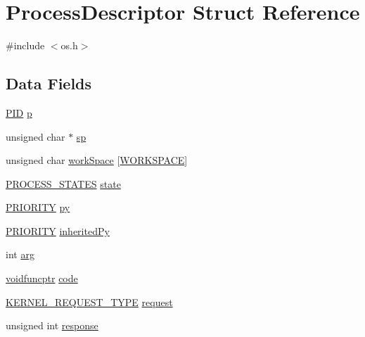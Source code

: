 \hypertarget{struct_process_descriptor}{}\section{Process\+Descriptor Struct Reference}
\label{struct_process_descriptor}


{\ttfamily \#include $<$os.\+h$>$}

\subsection*{Data Fields}
\begin{DoxyCompactItemize}
\item 
\hyperlink{os_8h_aa4f4d03691545cda70a42801c8b9096b}{P\+ID} \hyperlink{struct_process_descriptor_a29d3134ed439391d0cda6a328e877bb1}{p}
\item 
unsigned char $\ast$ \hyperlink{struct_process_descriptor_a66da4a0e35ef7a8e713697892196dddd}{sp}
\item 
unsigned char \hyperlink{struct_process_descriptor_ad45e5fb3f0fb598c044bcca7df695216}{work\+Space} \mbox{[}\hyperlink{os_8h_a420f71a6e3a201757631a92a1fb38529}{W\+O\+R\+K\+S\+P\+A\+CE}\mbox{]}
\item 
\hyperlink{os_8h_a0112d02f802d8a370eaed35faebd4502}{P\+R\+O\+C\+E\+S\+S\+\_\+\+S\+T\+A\+T\+ES} \hyperlink{struct_process_descriptor_af52ec0132414b93b48b8dae2e7b747b6}{state}
\item 
\hyperlink{os_8h_ac7feb3cd411cb0c0924b0defb19127d4}{P\+R\+I\+O\+R\+I\+TY} \hyperlink{struct_process_descriptor_af659a520409211372b37d3d07e89d039}{py}
\item 
\hyperlink{os_8h_ac7feb3cd411cb0c0924b0defb19127d4}{P\+R\+I\+O\+R\+I\+TY} \hyperlink{struct_process_descriptor_a68c51a8b8e163186c18347d7075be223}{inherited\+Py}
\item 
int \hyperlink{struct_process_descriptor_af09bff4320de23f28f0d261c3b124d6b}{arg}
\item 
\hyperlink{os_8h_afaa1ed37e5a81e2bcafd0ca0fee30da3}{voidfuncptr} \hyperlink{struct_process_descriptor_a6e1ba493cf7509ae1dde070c86c99064}{code}
\item 
\hyperlink{os_8h_aaa279b48476cb9236328475e13085103}{K\+E\+R\+N\+E\+L\+\_\+\+R\+E\+Q\+U\+E\+S\+T\+\_\+\+T\+Y\+PE} \hyperlink{struct_process_descriptor_a63baa734597723ef9d45d61c434f509d}{request}
\item 
unsigned int \hyperlink{struct_process_descriptor_a98086e1d9fcba9753c8fb4bd8d87359f}{response}
\item 

\end{DoxyCompactItemize}
